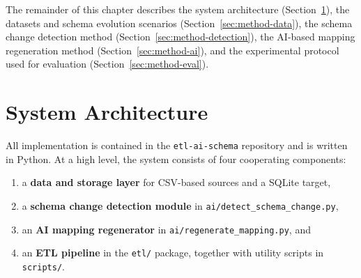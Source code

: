 The remainder of this chapter describes the system architecture
(Section~\ref{sec:method-architecture}), the datasets and schema evolution
scenarios (Section~\ref{sec:method-data}), the schema change detection method
(Section~\ref{sec:method-detection}), the AI-based mapping regeneration method
(Section~\ref{sec:method-ai}), and the experimental protocol used for
evaluation (Section~\ref{sec:method-eval}).


\section{System Architecture}
\label{sec:method-architecture}

All implementation is contained in the \texttt{etl-ai-schema} repository and
is written in Python. At a high level, the system consists of four cooperating
components:
%
\begin{enumerate}
  \item a \textbf{data and storage layer} for CSV-based sources and a SQLite
  target,
  \item a \textbf{schema change detection module} in
  \texttt{ai/detect\_schema\_change.py},
  \item an \textbf{AI mapping regenerator} in
  \texttt{ai/regenerate\_mapping.py}, and
  \item an \textbf{ETL pipeline} in the \texttt{etl/} package, together with
  utility scripts in \texttt{scripts/}.
\end{enumerate}

